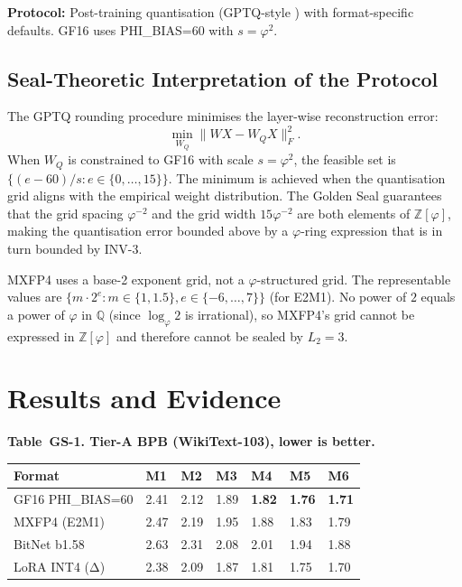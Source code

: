 \textbf{Protocol:} Post-training quantisation (GPTQ-style
\citep{frantar2022gptq}) with format-specific defaults.
GF16 uses PHI\_BIAS=60 with $s = \varphi^2$.

\subsection{Seal-Theoretic Interpretation of the Protocol}

The GPTQ rounding procedure minimises the layer-wise
reconstruction error:
\[
  \min_{W_Q} \| WX - W_Q X \|_F^2.
\]
When $W_Q$ is constrained to GF16 with scale $s = \varphi^2$,
the feasible set is $\{(e - 60)/s : e \in \{0,\ldots,15\}\}$.
The minimum is achieved when the quantisation grid aligns
with the empirical weight distribution.  The Golden Seal
guarantees that the grid spacing $\varphi^{-2}$ and the grid
width $15\varphi^{-2}$ are both elements of $\mathbb{Z}[\varphi]$,
making the quantisation error bounded above by a $\varphi$-ring
expression that is in turn bounded by INV-3.

\begin{remark}
MXFP4 uses a base-2 exponent grid, not a
$\varphi$-structured grid.  The representable values are
$\{m \cdot 2^e : m \in \{1, 1.5\}, e \in \{-6,\ldots,7\}\}$
(for E2M1).  No power of $2$ equals a power of $\varphi$ in
$\mathbb{Q}$ (since $\log_\varphi 2$ is irrational), so
MXFP4's grid cannot be expressed in $\mathbb{Z}[\varphi]$ and
therefore cannot be sealed by $L_2 = 3$.
\end{remark}

\section{Results and Evidence}
\label{sec:gs-results}

\textbf{Table~GS-1. Tier-A BPB (WikiText-103), lower is better.}

\begin{longtable}[]{@{}lllllll@{}}
\toprule\noalign{}
Format & M1 & M2 & M3 & M4 & M5 & M6 \\
\midrule\noalign{}
\endhead
\bottomrule\noalign{}
\endlastfoot
GF16 PHI\_BIAS=60 & 2.41 & 2.12 & 1.89 & \textbf{1.82} & \textbf{1.76} & \textbf{1.71} \\
MXFP4 (E2M1)     & 2.47 & 2.19 & 1.95 & 1.88 & 1.83 & 1.79 \\
BitNet b1.58      & 2.63 & 2.31 & 2.08 & 2.01 & 1.94 & 1.88 \\
LoRA INT4 (Δ)     & 2.38 & 2.09 & 1.87 & 1.81 & 1.75 & 1.70 \\
\end{longtable}

